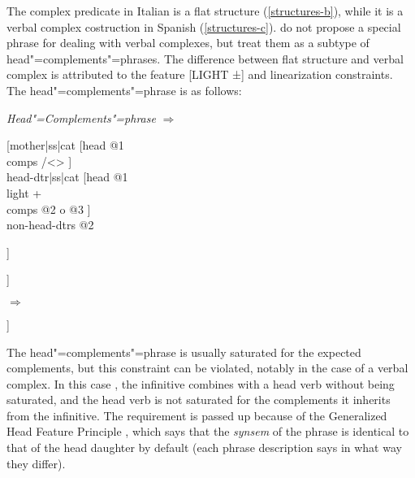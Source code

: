 \documentclass[output=paper]{langsci/langscibook}
\begin{document}
The complex predicate in Italian is a flat structure (\ref{structures-b}), while it is a verbal complex costruction in Spanish (\ref{structures-c}). \cite{AG2005} do not propose a special phrase for dealing with verbal complexes, but treat them as a subtype of head"=complements"=phrases. The difference between flat structure and verbal complex is attributed to the feature [LIGHT ±] and linearization constraints. The head"=complements"=phrase is as follows:
	
	
\begin{exe}
	\ex
	
	\begin{xlist}
		
		\ex \label{HCphrase} \textit{Head"=Complements"=phrase}  $\Rightarrow$
		
		
		\begin{avm}
			
			[{}mother|ss|cat [{}head  @1\\
			comps /<>
			] \\
			
			head-dtr|ss|cat  [{}head  @1\\
			light + \\ 
			comps @2 o @3
			]\\
			
			non-head-dtrs	 @2                           
			
			]
			
		\end{avm}
		
		
		\ex \label{phrase} 
		\begin{avm}
			[{}\normalfont{\textit{phrase}} [{}light +] 
			]
		\end{avm}
		$\Rightarrow$
		\begin{avm}
			[{}dtrs [{}light +]]
		\end{avm}
		
	\end{xlist}
\end{exe}


	
	The head"=complements"=phrase is usually saturated for the expected complements, but this constraint can be violated, notably in the case of a verbal complex. In this case , the infinitive combines with a head verb without being saturated, and the head verb is not saturated for the complements it inherits from the infinitive.  The requirement is passed up because of the Generalized Head Feature Principle \citep{GSag2000a-u}, which says that the \textit{synsem} of the phrase is identical to that of the head daughter by default (each phrase description says in what way they differ).
	
\end{document}
